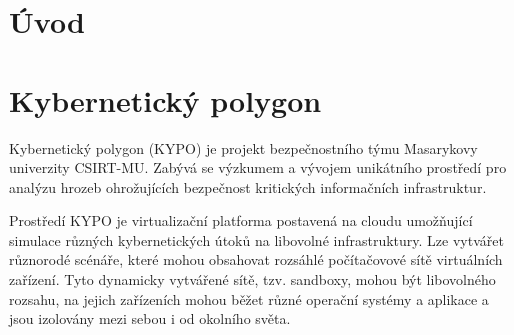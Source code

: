 \documentclass[
  digital, %
  oneside, %
  table,   %
  nolof,     %
  nolot,     %
]{fithesis3}
\begin{document}
\chapter{Úvod}

\chapter{Kybernetický polygon}
Kybernetický polygon (KYPO) je projekt bezpečnostního týmu Masarykovy univerzity CSIRT-MU. Zabývá se výzkumem a vývojem unikátního prostředí pro analýzu hrozeb ohrožujících bezpečnost kritických informačních infrastruktur.\cite{kypocz}\par
Prostředí KYPO je virtualizační platforma postavená na cloudu umožňující simulace různých kybernetických útoků na libovolné infrastruktury. Lze vytvářet různorodé scénáře, které mohou obsahovat rozsáhlé počítačovové sítě virtuálních zařízení. Tyto dynamicky vytvářené sítě, tzv. sandboxy, mohou být libovolného rozsahu, na jejich zařízeních mohou běžet různé operační systémy a aplikace a jsou izolovány mezi sebou i od okolního světa. \cite{ctfDesign}
\end{document}
